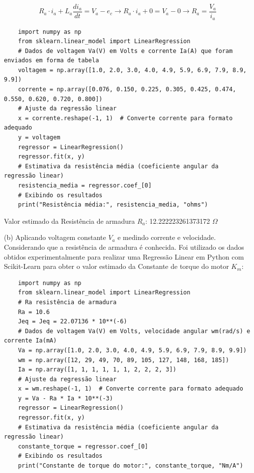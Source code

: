 \documentclass[10pt]{article}
\begin{document}
\begin{equation}
    R_a \cdot i_a + L_a \frac{di_a}{dt} = V_a - e_c \rightarrow R_a \cdot i_a + 0 = V_a - 0 \rightarrow R_a = \frac{V_a}{i_a}
\end{equation}

\begin{verbatim}
    import numpy as np
    from sklearn.linear_model import LinearRegression
    # Dados de voltagem Va(V) em Volts e corrente Ia(A) que foram enviados em forma de tabela
    voltagem = np.array([1.0, 2.0, 3.0, 4.0, 4.9, 5.9, 6.9, 7.9, 8.9, 9.9])
    corrente = np.array([0.076, 0.150, 0.225, 0.305, 0.425, 0.474, 0.550, 0.620, 0.720, 0.800])
    # Ajuste da regressão linear
    x = corrente.reshape(-1, 1)  # Converte corrente para formato adequado
    y = voltagem
    regressor = LinearRegression()
    regressor.fit(x, y)
    # Estimativa da resistência média (coeficiente angular da regressão linear)
    resistencia_media = regressor.coef_[0]
    # Exibindo os resultados
    print("Resistência média:", resistencia_media, "ohms")
\end{verbatim}

Valor estimado da Resistência de armadura $R_a$: 12.222223261373172 $\Omega$

\quad (b) Aplicando voltagem constante $V_a$ e medindo corrente e velocidade.
Considerando que a resistência de armadura é conhecida. Foi utilizado os dados obtidos
experimentalmente para realizar uma Regressão Linear em Python com Scikit-Learn
para obter o valor estimado da Constante de torque do motor $K_m$:

\begin{verbatim}
    import numpy as np
    from sklearn.linear_model import LinearRegression
    # Ra resistência de armadura
    Ra = 10.6
    Jeq = Jeq = 22.07136 * 10**(-6)
    # Dados de voltagem Va(V) em Volts, velocidade angular wm(rad/s) e corrente Ia(mA)
    Va = np.array([1.0, 2.0, 3.0, 4.0, 4.9, 5.9, 6.9, 7.9, 8.9, 9.9])
    wm = np.array([12, 29, 49, 70, 89, 105, 127, 148, 168, 185])
    Ia = np.array([1, 1, 1, 1, 1, 1, 2, 2, 2, 3])
    # Ajuste da regressão linear
    x = wm.reshape(-1, 1)  # Converte corrente para formato adequado
    y = Va - Ra * Ia * 10**(-3)
    regressor = LinearRegression()
    regressor.fit(x, y)
    # Estimativa da resistência média (coeficiente angular da regressão linear)
    constante_torque = regressor.coef_[0]
    # Exibindo os resultados
    print("Constante de torque do motor:", constante_torque, "Nm/A")
\end{verbatim}
\end{document}

